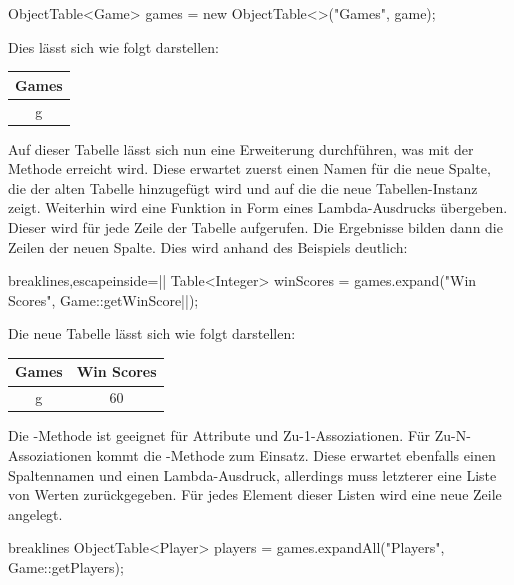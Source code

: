 \begin{jcodeblock}
    ObjectTable<Game> games = new ObjectTable<>("Games", game);
\end{jcodeblock}

Dies lässt sich wie folgt darstellen:

\begin{tabular}{|c|}
    \hline
    \textbf{Games} \\
    \hline
    g \\
    \hline
\end{tabular}

Auf dieser Tabelle lässt sich nun eine Erweiterung durchführen, was mit der Methode  erreicht wird.
Diese erwartet zuerst einen Namen für die neue Spalte, die der alten Tabelle hinzugefügt wird und auf die die neue Tabellen-Instanz zeigt.
Weiterhin wird eine Funktion in Form eines Lambda-Ausdrucks übergeben.
Dieser wird für jede Zeile der Tabelle aufgerufen.
Die Ergebnisse bilden dann die Zeilen der neuen Spalte.
Dies wird anhand des Beispiels deutlich:

\begin{jcodeblock*}{breaklines,escapeinside=||}
    Table<Integer> winScores = games.expand("Win Scores", Game::getWinScore|\footnotemark|);
\end{jcodeblock*}

Die neue Tabelle lässt sich wie folgt darstellen:

\begin{tabular}{|c|c|}
    \hline
    \textbf{Games} & \textbf{Win Scores} \\
    \hline
    g & 60 \\
    \hline
\end{tabular}

Die -Methode ist geeignet für Attribute und Zu-1-Assoziationen.
Für Zu-N-Assoziationen kommt die -Methode zum Einsatz.
Diese erwartet ebenfalls einen Spaltennamen und einen Lambda-Ausdruck,
allerdings muss letzterer eine Liste von Werten zurückgegeben.
Für jedes Element dieser Listen wird eine neue Zeile angelegt.

\begin{jcodeblock*}{breaklines}
    ObjectTable<Player> players = games.expandAll("Players", Game::getPlayers);
\end{jcodeblock*}

